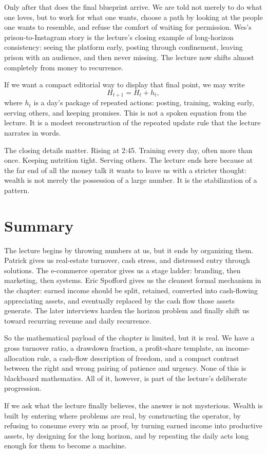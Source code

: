 Only after that does the final blueprint arrive. We are told not merely to do what one loves, but to work for what one wants, choose a path by looking at the people one wants to resemble, and refuse the comfort of waiting for permission. Wes's prison-to-Instagram story is the lecture's closing example of long-horizon consistency: seeing the platform early, posting through confinement, leaving prison with an audience, and then never missing. The lecture now shifts almost completely from money to recurrence.

If we want a compact editorial way to display that final point, we may write
\begin{equation}
H_{t+1} = H_t + h_t,
\end{equation}
where \(h_t\) is a day's package of repeated actions: posting, training, waking early, serving others, and keeping promises. This is not a spoken equation from the lecture. It is a modest reconstruction of the repeated update rule that the lecture narrates in words.

The closing details matter. Rising at 2:45. Training every day, often more than once. Keeping nutrition tight. Serving others. The lecture ends here because at the far end of all the money talk it wants to leave us with a stricter thought: wealth is not merely the possession of a large number. It is the stabilization of a pattern.

\section{Summary}

The lecture begins by throwing numbers at us, but it ends by organizing them. Patrick gives us real-estate turnover, cash stress, and distressed entry through solutions. The e-commerce operator gives us a stage ladder: branding, then marketing, then systems. Eric Spofford gives us the cleanest formal mechanism in the chapter: earned income should be split, retained, converted into cash-flowing appreciating assets, and eventually replaced by the cash flow those assets generate. The later interviews harden the horizon problem and finally shift us toward recurring revenue and daily recurrence.

So the mathematical payload of the chapter is limited, but it is real. We have a gross turnover ratio, a drawdown fraction, a profit-share template, an income-allocation rule, a cash-flow description of freedom, and a compact contrast between the right and wrong pairing of patience and urgency. None of this is blackboard mathematics. All of it, however, is part of the lecture's deliberate progression.

If we ask what the lecture finally believes, the answer is not mysterious. Wealth is built by entering where problems are real, by constructing the operator, by refusing to consume every win as proof, by turning earned income into productive assets, by designing for the long horizon, and by repeating the daily acts long enough for them to become a machine.